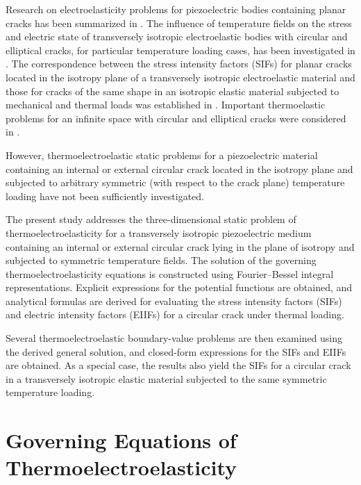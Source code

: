 Research on electroelasticity problems for piezoelectric bodies containing planar cracks has been summarized in \cite{Kirilyuk2,Kirilyuk6,Kirilyuk8}. 
The influence of temperature fields on the stress and electric state of transversely isotropic electroelastic bodies with circular and elliptical cracks, for particular temperature loading cases, has been investigated in \cite{Kirilyuk1,Kirilyuk2,Kirilyuk5,Kirilyuk6,Kirilyuk7,Kirilyuk8,Kirilyuk9,Kirilyuk10,Kirilyuk11,Kirilyuk12,Kirilyuk13,Kirilyuk14,Kirilyuk15,Kirilyuk16}. 
The correspondence between the stress intensity factors (SIFs) for planar cracks located in the isotropy plane of a transversely isotropic electroelastic material and those for cracks of the same shape in an isotropic elastic material subjected to mechanical and thermal loads was established in \cite{Kirilyuk6,Kirilyuk8}. 
Important thermoelastic problems for an infinite space with circular and elliptical cracks were considered in \cite{Kirilyuk3,Kirilyuk4}. 

However, thermoelectroelastic static problems for a piezoelectric material containing an internal or external circular crack located in the isotropy plane and subjected to arbitrary symmetric (with respect to the crack plane) temperature loading have not been sufficiently investigated.

The present study addresses the three-dimensional static problem of thermoelectroelasticity for a transversely isotropic piezoelectric medium containing an internal or external circular crack lying in the plane of isotropy and subjected to symmetric temperature fields. 
The solution of the governing thermoelectroelasticity equations is constructed using Fourier--Bessel integral representations. Explicit expressions for the potential functions are obtained, and analytical formulas are derived for evaluating the stress intensity factors (SIFs) and electric intensity factors (EIIFs) for a circular crack under thermal loading.

Several thermoelectroelastic boundary-value problems are then examined using the derived general solution, and closed-form expressions for the SIFs and EIIFs are obtained. 
As a special case, the results also yield the SIFs for a circular crack in a transversely isotropic elastic material subjected to the same symmetric temperature loading.

\section{Governing Equations of Thermoelectroelasticity}

